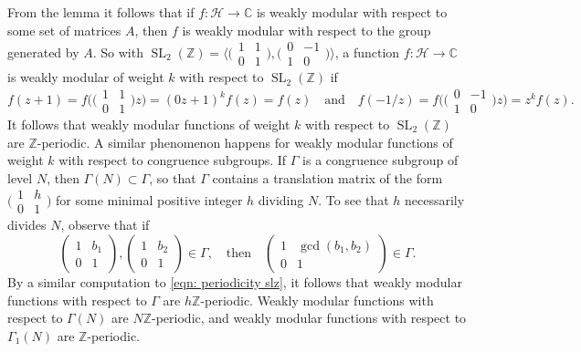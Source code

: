 \documentclass[10pt,leqno,twoside]{article}
\theoremstyle{plain}
\theoremstyle{definition}
\numberwithin{equation}{section}
\numberwithin{lem}{section}
\DeclareMathOperator{\SL}{SL}
\newcommand{\slz}{\SL_2(\mathbb{Z})}
\begin{document}
From the lemma it follows that if $f\colon \mathcal H\to\mathbb C$ is weakly modular with respect to some set of matrices $A$, then $f$ is weakly modular with respect to the group generated by $A$. So with $\slz = \big\langle\big(\!\begin{smallmatrix}
    1 & 1 \\ 0 & 1
\end{smallmatrix}\!\big), \big(\!\begin{smallmatrix}
    0 & -1 \\ 1 & 0
\end{smallmatrix}\!\big)\big\rangle$, a function $f\colon \mathcal H\to \mathbb C$ is weakly modular of weight $k$ with respect to $\slz$ if
\begin{equation}\label{eqn: periodicity slz}
    f(z+1) = f\big(\big(\!\begin{smallmatrix}
        1 & 1 \\ 0 & 1
    \end{smallmatrix}\!\big)z\big) = (0z+1)^kf(z) = f(z)\quad\text{and}\quad f(-1/z) = f\big(\big(\!\begin{smallmatrix}
        0 & -1 \\ 1 & 0
    \end{smallmatrix}\!\big)z\big) = z^kf(z).
\end{equation} It follows that weakly modular functions of weight $k$ with respect to $\slz$ are $\mathbb Z$-periodic. A similar phenomenon happens for weakly modular functions of weight $k$ with respect to congruence subgroups. If $\varGamma$ is a congruence subgroup of level $N$, then $\varGamma(N)\subset \varGamma$, so that $\varGamma$ contains a translation matrix of the form $\big(\!\begin{smallmatrix}
    1 & h \\ 0 & 1
\end{smallmatrix}\!\big)$ for some minimal positive integer $h$ dividing $N$. To see that $h$ necessarily divides $N$, observe that if 
\[\begin{pmatrix}
    1 & b_1 \\ 0 & 1
\end{pmatrix},\begin{pmatrix}
    1 & b_2 \\ 0 & 1
\end{pmatrix}\in\varGamma, \quad \text{then}\quad \begin{pmatrix}
    1 & \gcd(b_1,b_2) \\ 0 & 1
\end{pmatrix}\in \varGamma.\]
By a similar computation to \cref{eqn: periodicity slz}, it follows that weakly modular functions with respect to $\varGamma$ are $h\mathbb Z$-periodic. Weakly modular functions with respect to $\varGamma(N)$ are $N\mathbb{Z}$-periodic, and weakly modular functions with respect to $\varGamma_1(N)$ are $\mathbb Z$-periodic.
\end{document}

